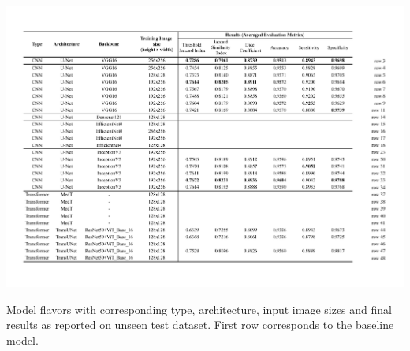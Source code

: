 \begin{table}[ht]
\centering
\includegraphics[width=\textwidth]{assets/results.pdf}
\caption[Results]{Model flavors with corresponding type, architecture, input image sizes and final results as reported on unseen test dataset. First row corresponds to the baseline model.}
\label{table:results}
\end{table}


